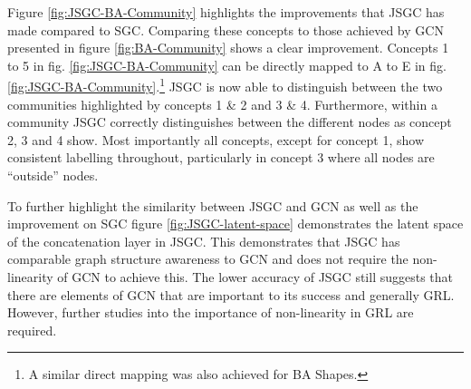 Figure \ref{fig:JSGC-BA-Community} highlights the improvements that JSGC has made compared to SGC.
Comparing these concepts to those achieved by GCN presented in figure \ref{fig:BA-Community} shows a clear improvement.
Concepts 1 to 5 in fig. \ref{fig:JSGC-BA-Community} can be directly mapped to A to E in fig. \ref{fig:JSGC-BA-Community}.\footnote{A similar direct mapping was also achieved for BA Shapes.}
JSGC is now able to distinguish between the two communities highlighted by concepts 1 \& 2 and 3 \& 4.
Furthermore, within a community JSGC correctly distinguishes between the different nodes as concept 2, 3 and 4 show.
Most importantly all concepts, except for concept 1, show consistent labelling throughout, particularly in concept 3 where all nodes are ``outside'' nodes.

To further highlight the similarity between JSGC and GCN as well as the improvement on SGC figure \ref{fig:JSGC-latent-space} demonstrates the latent space of the concatenation layer in JSGC.
This demonstrates that JSGC has comparable graph structure awareness to GCN and does not require the non-linearity of GCN to achieve this.
The lower accuracy of JSGC still suggests that there are elements of GCN that are important to its success and generally GRL.
However, further studies into the importance of non-linearity in GRL are required.

